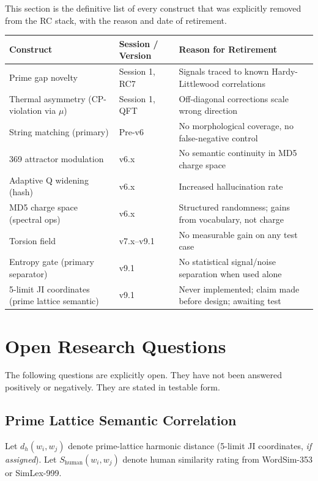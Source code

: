 \documentclass[11pt,twoside]{article}
\begin{document}
This section is the definitive list of every construct that was explicitly removed
from the RC stack, with the reason and date of retirement.

\begin{longtable}{p{4.5cm} p{3.5cm} p{4.5cm}}
\toprule
\textbf{Construct} & \textbf{Session / Version} & \textbf{Reason for Retirement} \\
\midrule
\endhead
\bottomrule
\endfoot
Prime gap novelty & Session 1, RC7 & Signals traced to known Hardy-Littlewood correlations \\
Thermal asymmetry (CP-violation via $\mu$) & Session 1, QFT & Off-diagonal corrections scale wrong direction \\
String matching (primary) & Pre-v6 & No morphological coverage, no false-negative control \\
369 attractor modulation & v6.x & No semantic continuity in MD5 charge space \\
Adaptive Q widening (hash) & v6.x & Increased hallucination rate \\
MD5 charge space (spectral ops) & v6.x & Structured randomness; gains from vocabulary, not charge \\
Torsion field & v7.x--v9.1 & No measurable gain on any test case \\
Entropy gate (primary separator) & v9.1 & No statistical signal/noise separation when used alone \\
5-limit JI coordinates (prime lattice semantic) & v9.1 & Never implemented; claim made before design; awaiting test \\
\end{longtable}

\section{Open Research Questions}

The following questions are explicitly open. They have not been answered positively
or negatively. They are stated in testable form.

\subsection{Prime Lattice Semantic Correlation}

Let $d_h(w_i, w_j)$ denote prime-lattice harmonic distance (5-limit JI coordinates,
\emph{if assigned}). Let $S_{\text{human}}(w_i, w_j)$ denote human similarity rating
from WordSim-353 or SimLex-999.
\end{document}
